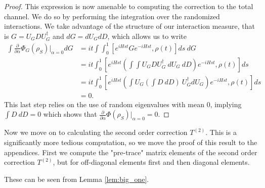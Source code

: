 \documentclass{article}
\newcommand{\parens}[1]{\left( #1 \right)}
\begin{document}
\begin{proof}
    This expression is now amenable to computing the correction to the total channel. We do so by performing the integration over the randomized interactions. We take advantage of the structure of our interaction measure, that is $G = U_G D U_G^\dagger$ and $dG = dU_G dD$, which allows us to write
    \begin{align}
        \int \frac{\partial}{\partial \alpha} \Phi_G(\rho_S) \bigg|_{\alpha = 0} dG &= it \int \int_0^1 \left[ e^{i H s t} G e^{-i H s t}, \rho(t) \right] ds ~dG \\
        &= it \int_0^1 \left[ e^{i H s t} \parens{\int \int U_G D U_G^\dagger ~dU_G ~ dD} e^{-i H s t}, \rho(t)  \right] ds \\
        &= i t \int_0^1 \left[ e^{i H s t} \parens{\int U_G \parens{\int D ~ dD} ~ U_G^\dagger dU_G } e^{-i H s t}, \rho(t) \right] ds \\
        &= 0.
    \end{align}
    This last step relies on the use of random eigenvalues with mean 0, implying $\int D ~dD = 0$ which shows that $\frac{\partial}{\partial \alpha} \Phi(\rho_S) \big|_{\alpha = 0 } = 0$.
\end{proof}

Now we move on to calculating the second order correction $T^{(2)}$. This is a significantly more tedious computation, so we move the proof of this result to the appendices. First we compute the "pre-trace" matrix elements of the second order correction $T^{(2)}$, but for off-diagonal elements first and then diagonal elements.

These can be seen from Lemma \ref{lem:big_one}.
\end{document}
